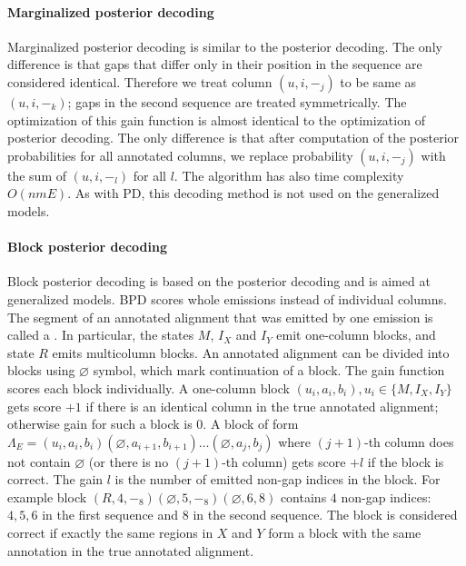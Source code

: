 \paragraph{Marginalized posterior decoding}
Marginalized posterior decoding is similar to the posterior decoding. The only
difference is that gaps that differ only in their position in the sequence are
considered identical.  Therefore we treat column $(u, i, -_j)$ to be same as
$(u, i, -_k)$; gaps in the second sequence are treated symmetrically. The
optimization of this gain function is almost identical to the optimization of
posterior decoding. The only difference is that after computation of the
posterior probabilities for all annotated columns, we replace probability $(u, i, -_j)$ with the sum of
$(u, i, -_l)$ for all $l$. The algorithm has also time complexity $O(nmE)$.  As
with PD, this decoding method is not used on the generalized models.

\paragraph{Block posterior decoding}
Block posterior decoding is based on the posterior decoding and is aimed at
generalized models. BPD scores whole emissions instead of individual columns.
The segment of an annotated alignment that was emitted by one emission is
called a . In particular, the states $M$, $I_X$ and $I_Y$
emit one-column blocks, and state $R$ emits multicolumn blocks. An annotated
alignment can be divided into blocks using $\varnothing$ symbol, which mark
continuation of a block.  The gain function scores each block individually. A
one-column block $(u_i, a_i, b_i), u_i\in\{M, I_X, I_Y\}$ gets score $+1$ if
there is an identical column in the true annotated alignment; otherwise gain
for such a block is $0$. A block of form $\Lambda_E=(u_i, a_i,
b_i)(\varnothing, a_{i+1}, b_{i+1})\dots (\varnothing, a_{j}, b_{j})$ where
$(j+1)$-th column does not contain $\varnothing$ (or there is no $(j+1)$-th
column) gets score $+l$ if the block is correct. The gain $l$ is the number of
emitted non-gap indices in the block. For example block $(R, 4,
-_8)(\varnothing, 5, -_8)(\varnothing, 6, 8)$ contains $4$ non-gap indices: $4,
5, 6$ in the first sequence and $8$ in the second sequence.  The block is
considered correct if exactly the same regions in $X$ and $Y$ form a block with
the same annotation in the true annotated alignment.

